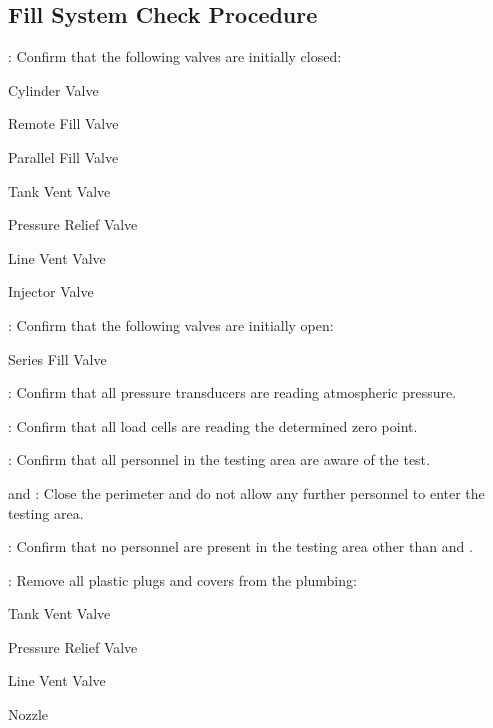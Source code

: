 \newpage

\subsection{Fill System Check Procedure}
\begin{checklist}
    \item \primary{}: Confirm that the following valves are initially closed:
    \begin{checklist}
        \item Cylinder Valve
        \item Remote Fill Valve
        \item Parallel Fill Valve
        \item Tank Vent Valve
        \item Pressure Relief Valve
        \item Line Vent Valve
        \item Injector Valve
    \end{checklist}
    \item \primary{}: Confirm that the following valves are initially open:
    \begin{checklist}
        \item Series Fill Valve
    \end{checklist}
    \item \daq: Confirm that all pressure transducers are reading atmospheric pressure.
    \item \daq: Confirm that all load cells are reading the determined zero point.
    \item \ops: Confirm that all personnel in the testing area are aware of the test.
    \item \peri{} and \perii: Close the perimeter and do not allow any further personnel to enter the testing area.
    \item \secondary: Confirm that no personnel are present in the testing area other than \primary{} and \secondary.
    \item \primary: Remove all plastic plugs and covers from the plumbing:
    \begin {checklist}
        \item Tank Vent Valve
        \item Pressure Relief Valve
        \item Line Vent Valve
        \item Nozzle
    \end {checklist}

\end{checklist}

